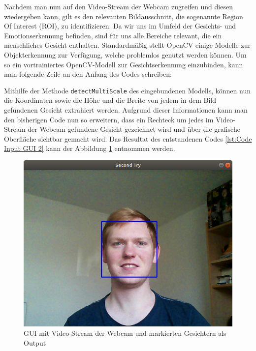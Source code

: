 \documentclass[12pt, a4paper]{report}
\begin{document}
Nachdem man nun auf den Video-Stream der Webcam zugreifen und diesen wiedergeben kann, gilt es den relevanten Bildausschnitt, die sogenannte Region Of Interest (ROI), zu identifizieren. Da wir uns im Umfeld der Gesichts- und Emotionserkennung befinden, sind für uns alle Bereiche relevant, die ein menschliches Gesicht enthalten. Standardmäßig stellt OpenCV einige Modelle zur Objekterkennung zur Verfügung, welche problemlos genutzt werden können. Um so ein vortrainiertes OpenCV-Modell zur Gesichtserkennung einzubinden, kann man folgende Zeile an den Anfang des Codes schreiben:\newline

Mithilfe der Methode \texttt{detectMultiScale} des eingebundenen Modells, können nun die Koordinaten sowie die Höhe und die Breite von jedem in dem Bild gefundenen Gesicht extrahiert werden. Aufgrund dieser Informationen kann man den bisherigen Code nun so erweitern, dass ein Rechteck um jedes im Video-Stream der Webcam gefundene Gesicht gezeichnet wird und über die grafische Oberfläche sichtbar gemacht wird. Das Resultat des entstandenen Codes \ref{lst:Code Input GUI 2} kann der Abbildung \ref{fig:Input GUI 2} entnommen werden.
\begin{figure}[h]
\includegraphics[width=\linewidth]{Bilder/InputGUI2.png}
\caption{GUI mit Video-Stream der Webcam und markierten Gesichtern als Output}
\label{fig:Input GUI 2}
\end{figure}
\end{document}
